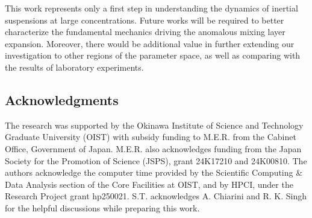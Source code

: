 \documentclass[aps,prl,twocolumn,showpacs,longbibliography]{revtex4-1}
\begin{document}
This work represents only a first step in understanding the dynamics of inertial suspensions at large concentrations. Future works will be required to better characterize the fundamental mechanics driving the anomalous mixing layer expansion. Moreover, there would be additional value in further extending our investigation to other regions of the parameter space, as well as comparing with the results of laboratory experiments.











\begin{acknowledgments}
\section*{Acknowledgments}
The research was supported by the Okinawa Institute of Science and Technology Graduate University (OIST) with subsidy funding to M.E.R. from the Cabinet Office, Government of Japan. M.E.R. also acknowledges funding from the Japan Society for the Promotion of Science (JSPS), grant 24K17210 and 24K00810. The authors acknowledge the computer time provided by the Scientific Computing \& Data Analysis section of the Core Facilities at OIST, and by HPCI, under the Research Project grant hp250021. S.T. acknowledges A. Chiarini and R. K. Singh for the helpful discussions while preparing this work.
\vspace{-0.5cm}
\end{acknowledgments}
\end{document}
